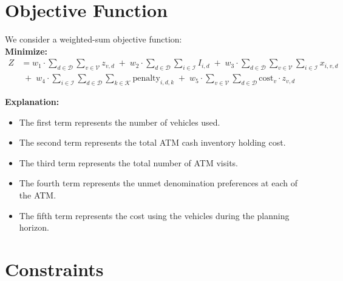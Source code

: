 \documentclass[11pt]{article}
\begin{document}
\section*{Objective Function}
We consider a weighted-sum objective function:\\
\textbf{Minimize:}
\begin{align*}
    Z &= w_1\cdot \sum_{d \in \mathcal{D}} \sum_{v \in \mathcal{V}} z_{v,d} \;+\; w_2 \cdot\sum_{d \in \mathcal{D}} \sum_{i \in \mathcal{I}} I_{i,d} \;+\; w_3\cdot \sum_{d \in \mathcal{D}} \sum_{v \in \mathcal{V}} \sum_{i \in \mathcal{I}} x_{i,v,d}\\
     &\;+\; w_4\cdot \sum_{i \in \mathcal{I}}\sum_{d \in \mathcal{D}}\sum_{k \in \mathcal{K}} \text{penalty}_{i,d,k} \;+\; w_5 \cdot\sum_{v \in \mathcal{V}}\sum_{d \in \mathcal{D}} \text{cost}_v \cdot z_{v,d}
\end{align*}

\noindent \textbf{Explanation:}
\begin{itemize}[leftmargin=1cm]
    \item The first term represents the number of vehicles used.
    \item The second term represents the total ATM cash inventory holding cost.
    \item The third term represents the total number of ATM visits.
    \item The fourth term represents the unmet denomination preferences at each of the ATM.
    \item The fifth term represents the cost using the vehicles during the planning horizon.
\end{itemize}

\section*{Constraints}
\end{document}
